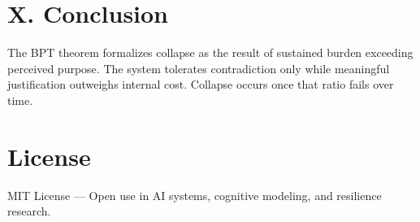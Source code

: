 \documentclass[12pt]{article}
\begin{document}
\section*{X. Conclusion}

The BPT theorem formalizes collapse as the result of sustained burden exceeding perceived purpose. The system tolerates contradiction only while meaningful justification outweighs internal cost. Collapse occurs once that ratio fails over time.

\section*{License}

MIT License — Open use in AI systems, cognitive modeling, and resilience research.
\end{document}
